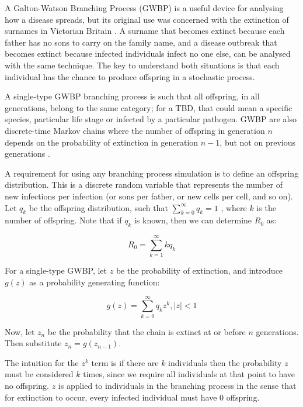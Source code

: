 \documentclass[hidelinks]{article}
\begin{document}
A Galton-Watson Branching Process (GWBP) is a useful device for analysing how a disease spreads, but its original use was concerned with the extinction of surnames in Victorian Britain \citep{Athreya1972}. A surname that becomes extinct because each father has no sons to carry on the family name, and a disease outbreak that becomes extinct because infected individuals infect no one else, can be analysed with the same technique. The key to understand both situations is that each individual has the chance to produce offspring in a stochastic process.

A single-type GWBP branching process is such that all offspring, in all generations, belong to the same category; for a TBD, that could mean a specific species, particular life stage or infected by a particular pathogen. GWBP are also discrete-time Markov chains where the number of offspring in generation $ n $ depends on the probability of extinction in generation $ n - 1 $, but not on previous generations \citep{Allen2019}.

A requirement for using any branching process simulation is to define an offspring distribution. This is a discrete random variable that represents the number of new infections per infection (or sons per father, or new cells per cell, and so on). Let $ q_k $ be the offspring distribution, such that $ \sum_{k=0}^\infty q_k = 1 $ \citep{Diekman2000}, where $ k $ is the number of offspring.  Note that if $ q_k $ is known, then we can determine $ R_0 $ as:

\begin{equation}\label{offspringR0}
	R_0 = \sum_{k=1}^\infty k q_k
\end{equation}

For a single-type GWBP, let $ z $ be the probability of extinction, and introduce $ g(z) $ as a probability generating function:

\begin{equation}\label{BranchingProcessPGF}
    g(z) = \sum_{k=0}^\infty q_k z^k, |z| < 1
\end{equation}

Now, let $ z_n $ be the probability that the chain is extinct at or before $ n $ generations. Then substitute $ z_n = g(z_{n-1})$.

The intuition for the $ z^k $ term is if there are $ k $ individuals then the probability $ z $ must be considered $ k $ times, since we require all individuals at that point to have no offspring. $ z $ is applied to individuals in the branching process in the sense that for extinction to occur, every infected individual must have $ 0 $ offspring. 
\end{document}
